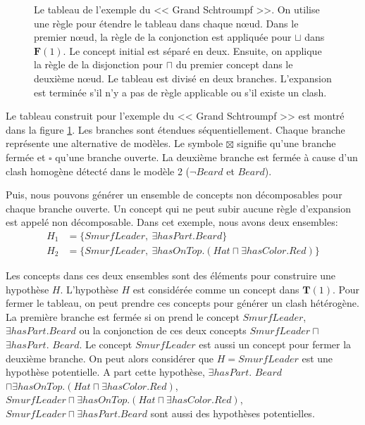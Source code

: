 \documentclass{article}
\begin{document}
\begin{figure}
\begin{tikzpicture}
\end{tikzpicture}
\caption{ Le tableau de l'exemple du << Grand Schtroumpf >>. On utilise une règle pour étendre le tableau dans chaque n{\oe}ud.
Dans le premier n{\oe}ud, la règle de la conjonction est appliquée pour $\sqcup$ dans $\mathbf{F}(1)$. Le concept initial est séparé en deux. Ensuite, on applique
la règle de la disjonction pour $\sqcap$ du premier concept dans le deuxième n{\oe}ud. Le tableau est divisé en deux branches. L'expansion est terminée s'il n'y a pas 
de règle applicable ou s'il existe un clash.}\label{grandst}
\end{figure}

Le tableau construit pour l'exemple du << Grand Schtroumpf >> est montré dans la figure \ref{grandst}. Les branches sont étendues séquentiellement. Chaque branche représente une alternative
de modèles. Le symbole $ \boxtimes $ signifie qu'une branche fermée et $ \square $ qu'une branche ouverte. La deuxième branche est fermée à cause d'un clash homogène
détecté dans le modèle 2 ($\neg Beard$ et $Beard$).

Puis, nous pouvons générer un ensemble de concepts non décomposables pour chaque branche ouverte. Un concept qui ne peut subir aucune règle d'expansion est appelé non décomposable.
Dans cet exemple, nous avons deux ensembles:\vspace{-0.2cm}
\begin{align*}
H_1&=\{SmurfLeader,~\exists hasPart.Beard\}\\
H_2&=\{SmurfLeader,~\exists hasOnTop.(Hat \sqcap  \exists hasColor.Red)\}
\end{align*}

Les concepts dans ces deux ensembles sont des éléments pour construire une hypothèse $H$. L'hypothèse $H$ est considérée comme un concept dans $\mathbf{T}(1)$. 
Pour fermer le tableau, on peut prendre ces concepts pour générer un clash hétérogène.
La première branche est fermée si on prend le concept $SmurfLeader$, $\exists hasPart.Beard$ ou la conjonction de ces deux concepts 
$SmurfLeader\sqcap$ $\exists hasPart.$ $Beard$. Le concept $SmurfLeader$ est aussi un concept pour fermer la deuxième branche. On peut alors considérer que $H=SmurfLeader$
est une hypothèse potentielle. A part cette hypothèse, $\exists hasPart.$ $Beard$ $\sqcap \exists hasOnTop.(Hat\sqcap\exists hasColor.Red)$, 
$SmurfLeader\sqcap\exists hasOnTop.(Hat\sqcap \exists hasColor.Red)$, $SmurfLeader \sqcap \exists hasPart.Beard$ sont aussi des hypothèses potentielles.
\end{document}
